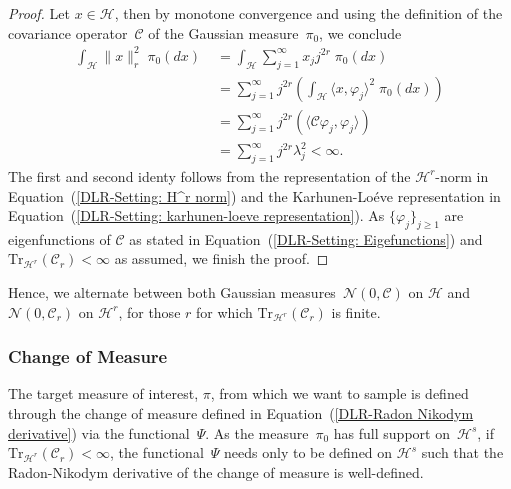 \begin{proof}
 Let $x \in \mathcal{H}$, then by monotone convergence and using the definition of the covariance operator~$\mathcal{C}$ of the Gaussian measure~$\pi_0$, we conclude
 \begin{align*}
  \int_{\mathcal{H}} \| x \|_r^2 \; \pi_0 (dx) & \; = \int_{\mathcal{H}} \sum_{j=1}^{\infty} x_j j^{2r} \; \pi_0 (dx)  \\
  & \; = \sum_{j=1}^{\infty} j^{2r} ( \int_{\mathcal{H}}  \langle x, \varphi_j \rangle^2  \; \pi_0 (dx) )  \\
  & \; = \sum_{j=1}^{\infty} j^{2r} (   \langle \mathcal{C} \varphi_j, \varphi_j \rangle   )    \\
  & \; = \sum_{j=1}^{\infty} j^{2r} \lambda_j^2 < \infty.
 \end{align*}
 The first and second identy follows from the representation of the $\mathcal{H}^r$-norm in Equation~(\ref{DLR-Setting: H^r norm}) and the Karhunen-Lo\'{e}ve representation in Equation~(\ref{DLR-Setting: karhunen-loeve representation}). As $\{  \varphi_j \}_{j \geq 1}$ are eigenfunctions of $\mathcal{C}$ as stated in Equation~(\ref{DLR-Setting: Eigefunctions}) and $\text{Tr}_{\mathcal{H}^r}(\mathcal{C}_r) < \infty$ as assumed, we finish the proof.

\end{proof}

Hence, we alternate between both Gaussian measures~$\mathcal{N}(0, \mathcal{C})$ on $\mathcal{H}$ and $\mathcal{N}(0, \mathcal{C}_r)$ on $\mathcal{H}^r$, for those $r$ for which $\text{Tr}_{\mathcal{H}^r}(\mathcal{C}_r)$ is finite.



\subsubsection{Change of Measure}

The target measure of interest, $\pi$, from which we want to sample is defined through the change of measure defined in Equation~(\ref{DLR-Radon Nikodym derivative}) via the functional~$\Psi$. As the measure~$\pi_0$ has full support on~$\mathcal{H}^s$, if $\text{Tr}_{\mathcal{H}^r}(\mathcal{C}_r) < \infty$, the functional~$\Psi$ needs only to be defined on $\mathcal{H}^s$ such that the Radon-Nikodym derivative of the change of measure is well-defined.

